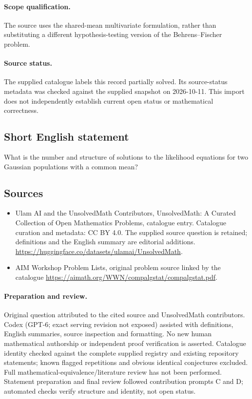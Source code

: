 \documentclass[11pt]{article}
\begin{document}
\paragraph{Scope qualification.}
The source uses the shared-mean multivariate formulation, rather than substituting a different hypothesis-testing version of the Behrens--Fischer problem.
\paragraph{Source status.}
The supplied catalogue labels this record partially solved. Its source-status metadata was checked against the supplied snapshot on 2026-10-11. This import does not independently establish current open status or mathematical correctness.
\subsection{Short English statement}
What is the number and structure of solutions to the likelihood equations for two Gaussian populations with a common mean?
\subsection{Sources}
\begin{itemize}
\item[S1] Ulam AI and the UnsolvedMath Contributors, UnsolvedMath: A Curated Collection of Open Mathematics Problems, catalogue entry. Catalogue curation and metadata: CC BY 4.0. The supplied source question is retained; definitions and the English summary are editorial additions.
\url{https://huggingface.co/datasets/ulamai/UnsolvedMath}.
\item[S2] AIM Workshop Problem Lists, original problem source linked by the catalogue
\url{https://aimath.org/WWN/compalgstat/compalgstat.pdf}.
\end{itemize}
\paragraph{Preparation and review.}
Original question attributed to the cited source and UnsolvedMath contributors. Codex (GPT-6; exact serving revision not exposed) assisted with definitions, English summaries, source inspection and formatting. No new human mathematical authorship or independent proof verification is asserted. Catalogue identity checked against the complete supplied registry and existing repository statements; known flagged repetitions and obvious identical conjectures excluded. Full mathematical-equivalence/literature review has not been performed. Statement preparation and final review followed contribution prompts C and D; automated checks verify structure and identity, not open status.
\label{end:statement}
\end{document}
